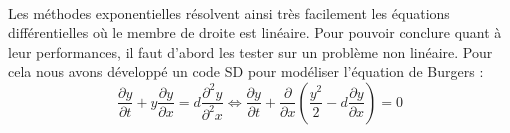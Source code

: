         \paragraph{}
        Les méthodes exponentielles résolvent ainsi très facilement les équations différentielles où le membre de droite est linéaire. Pour pouvoir conclure quant à leur performances, il faut d'abord les tester sur un problème non linéaire. Pour cela nous avons développé un code SD pour modéliser l'équation de Burgers :
        \begin{equation}
            \frac{\partial y}{\partial t} + y\frac{\partial y}{\partial x} = d\frac{\partial^2 y}{\partial^2 x}
            \Longleftrightarrow \frac{\partial y}{\partial t} + \frac{\partial}{\partial x}\left(\frac{y^2}{2} - d\frac{\partial y}{\partial x}\right) = 0
            \label{eq:burgers}
        \end{equation}
